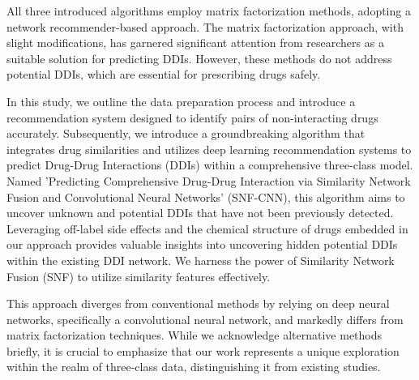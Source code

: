 \documentclass[unnumsec,webpdf,contemporary,large]{oup-authoring-template}%
\theoremstyle{thmstyleone}%
\theoremstyle{thmstyletwo}%
\theoremstyle{thmstylethree}%
\begin{document}
All three introduced algorithms employ matrix factorization methods, adopting a network recommender-based approach. The matrix factorization approach, with slight modifications, has garnered significant attention from researchers as a suitable solution for predicting DDIs. However, these methods do not address potential DDIs, which are essential for prescribing drugs safely.

In this study, we outline the data preparation process and introduce a recommendation system designed to identify pairs of non-interacting drugs accurately. Subsequently, we introduce a groundbreaking algorithm that integrates drug similarities and utilizes deep learning recommendation systems to predict Drug-Drug Interactions (DDIs) within a comprehensive three-class model. Named 'Predicting Comprehensive Drug-Drug Interaction via Similarity Network Fusion and Convolutional Neural Networks' (SNF-CNN), this algorithm aims to uncover unknown and potential DDIs that have not been previously detected. Leveraging off-label side effects and the chemical structure of drugs embedded in our approach provides valuable insights into uncovering hidden potential DDIs within the existing DDI network. We harness the power of Similarity Network Fusion (SNF) to utilize similarity features effectively.

This approach diverges from conventional methods by relying on deep neural networks, specifically a convolutional neural network, and markedly differs from matrix factorization techniques. While we acknowledge alternative methods briefly, it is crucial to emphasize that our work represents a unique exploration within the realm of three-class data, distinguishing it from existing studies.


\end{document}
